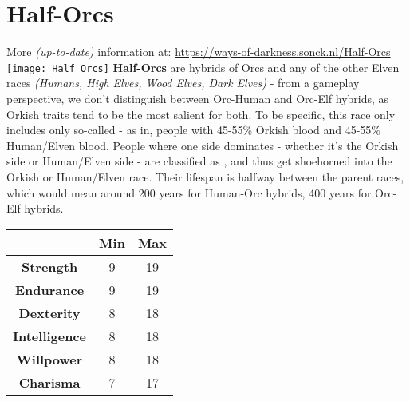\documentclass[openany,10pt,a4paper]{book}
\begin{document}
\section{Half-Orcs}
More \textit{(up-to-date)} information at: \url{https://ways-of-darkness.sonck.nl/Half-Orcs}\newline
\texttt{[image: Half\_Orcs]}\newline
\textbf{Half-Orcs} are hybrids of Orcs and any of the other Elven races \textit{(Humans, High Elves, Wood Elves, Dark Elves)} - from a gameplay perspective, we don't distinguish between Orc-Human and Orc-Elf hybrids, as Orkish traits tend to be the most salient for both. To be specific, this race only includes only so-called - as in, people with 45-55\% Orkish blood and 45-55\% Human/Elven blood. People where one side dominates - whether it's the Orkish side or Human/Elven side - are classified as , and thus get shoehorned into the Orkish or Human/Elven race. Their lifespan is halfway between the parent races, which would mean around 200 years for Human-Orc hybrids, 400 years for Orc-Elf hybrids.\newline
\begin{tabular}{|c|c|c|}
\hline
 & \textbf{Min} & \textbf{Max} \\ \hline
\textbf{Strength} & 9 & 19 \\ \hline
\textbf{Endurance} & 9 & 19 \\ \hline
\textbf{Dexterity} & 8 & 18 \\ \hline
\textbf{Intelligence} & 8 & 18 \\ \hline
\textbf{Willpower} & 8 & 18 \\ \hline
\textbf{Charisma} & 7 & 17 \\ \hline
\end{tabular}\newline
{}\newpage
\end{document}
